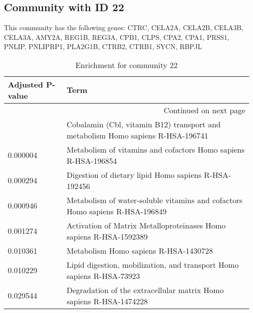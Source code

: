 \subsection*{Community with ID 22}
This community has the following genes: CTRC, CELA2A, CELA2B, CELA3B, CELA3A, AMY2A, REG1B, REG3A, CPB1, CLPS, CPA2, CPA1, PRSS1, PNLIP, PNLIPRP1, PLA2G1B, CTRB2, CTRB1, SYCN, RBPJL
\\
\begin{longtable}{p{2.4cm}p{14.5cm}}
\caption{Enrichment for community 22}\\
\toprule
Adjusted \newline P-value &                                                                             Term \\
\midrule
\endhead
\midrule
\multicolumn{2}{r}{{Continued on next page}} \\
\midrule
\endfoot

\bottomrule
\endlastfoot
                 0.000007 &  Cobalamin (Cbl, vitamin B12) transport and metabolism Homo sapiens R-HSA-196741 \\
                 0.000004 &                   Metabolism of vitamins and cofactors Homo sapiens R-HSA-196854 \\
                 0.000294 &                             Digestion of dietary lipid Homo sapiens R-HSA-192456 \\
                 0.000946 &     Metabolism of water-soluble vitamins and cofactors Homo sapiens R-HSA-196849 \\
                 0.001274 &               Activation of Matrix Metalloproteinases Homo sapiens R-HSA-1592389 \\
                 0.010361 &                                            Metabolism Homo sapiens R-HSA-1430728 \\
                 0.010229 &            Lipid digestion, mobilization, and transport Homo sapiens R-HSA-73923 \\
                 0.029544 &               Degradation of the extracellular matrix Homo sapiens R-HSA-1474228 \\
\end{longtable}


